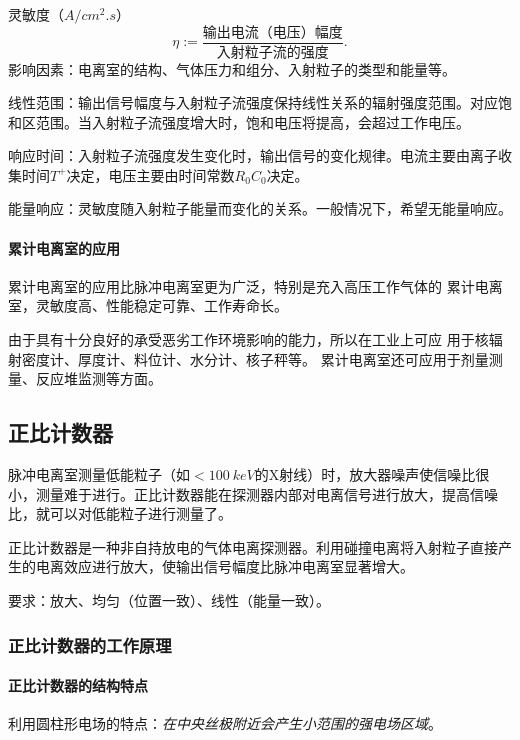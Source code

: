 灵敏度（$\si{A/cm^2.s}$）
\[
	\eta:=\frac{\text{输出电流（电压）幅度}}{\text{入射粒子流的强度}}.
\]
影响因素：电离室的结构、气体压力和组分、入射粒子的类型和能量等。

线性范围：输出信号幅度与入射粒子流强度保持线性关系的辐射强度范围。对应饱和区范围。当入射粒子流强度增大时，饱和电压将提高，会超过工作电压。

响应时间：入射粒子流强度发生变化时，输出信号的变化规律。电流主要由离子收集时间$T^+$决定，电压主要由时间常数$R_0C_0$决定。

能量响应：灵敏度随入射粒子能量而变化的关系。一般情况下，希望无能量响应。
\paragraph{累计电离室的应用}
累计电离室的应用比脉冲电离室更为广泛，特别是充入高压工作气体的
累计电离室，灵敏度高、性能稳定可靠、工作寿命长。

由于具有十分良好的承受恶劣工作环境影响的能力，所以在工业上可应
用于核辐射密度计、厚度计、料位计、水分计、核子秤等。
累计电离室还可应用于剂量测量、反应堆监测等方面。

\subsection{正比计数器}
脉冲电离室测量低能粒子（如$<\SI{100}{keV}$的X射线）时，放大器噪声使信噪比很小，测量难于进行。正比计数器能在探测器内部对电离信号进行放大，提高信噪比，就可以对低能粒子进行测量了。

正比计数器是一种非自持放电的气体电离探测器。利用碰撞电离将入射粒子直接产生的电离效应进行放大，使输出信号幅度比脉冲电离室显著增大。

要求：放大、均匀（位置一致）、线性（能量一致）。
\subsubsection{正比计数器的工作原理}
\paragraph{正比计数器的结构特点}
利用圆柱形电场的特点：\textit{在中央丝极附近会产生小范围的强电场区域}。

